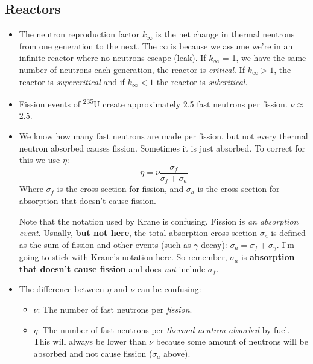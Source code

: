 \documentclass[letter]{article}
\begin{document}
\subsection{Reactors}
\begin{itemize}
\item The neutron reproduction factor $k_\infty$ is the net change in
  thermal neutrons from one generation to the next. The $\infty$ is
  because we assume we're in an infinite reactor where no neutrons
  escape (leak). If $k_\infty$ = 1, we have the same number of neutrons
  each generation, the reactor is \textit{critical}. If $k_\infty
  > 1$, the reactor is \textit{supercritical} and if $k_\infty < 1$ the
  reactor is \textit{subcritical}.~\cite[pp. 501]{krane}
\item Fission events of \textsuperscript{235}U create approximately
  2.5 fast neutrons per fission. $\nu \approx$
  2.5.~\cite[pp. 501]{krane}
\item We know how many fast neutrons are made per fission, but not
  every thermal neutron absorbed causes fission. Sometimes it is just
  absorbed. To correct for this we use $\eta$:
  \begin{equation*}
    \eta = \nu\frac{\sigma_f}{\sigma_f+\sigma_a}
  \end{equation*}
Where $\sigma_f$ is the cross section for fission, and $\sigma_a$ is
the cross section for absorption that doesn't cause
fission.~\cite[pp.502]{krane}
\begin{framed}
  Note that the notation used by Krane is confusing. Fission is
  \textit{an absorption event}. Usually, \textbf{but not here}, the total absorption cross
  section $\sigma_a$ is defined as the sum of fission and other events
  (such as $\gamma$-decay): $\sigma_a = \sigma_f +
  \sigma_\gamma$. I'm going to stick with Krane's notation here. So
  remember, $\sigma_a$ is \textbf{absorption that doesn't cause
    fission} and does \textit{not} include $\sigma_f$.
\end{framed}
\item The
difference between $\eta$ and $\nu$ can be confusing:
\begin{itemize}
\item $\nu$: The number of fast neutrons per \textit{fission}.
\item $\eta$: The number of fast neutrons per \textit{thermal neutron
    absorbed} by fuel. This will always be lower than $\nu$ because
  some amount of neutrons will be absorbed and not cause fission
  ($\sigma_a$ above).
\end{itemize}

\end{itemize}
\end{document}
